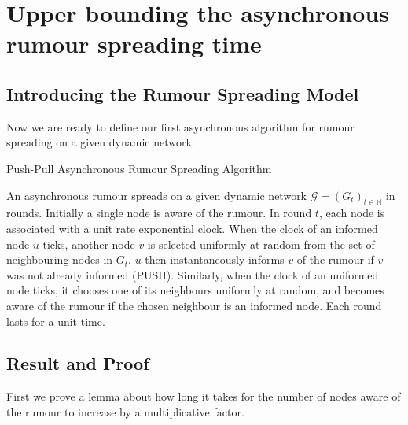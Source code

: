 \section{Upper bounding the asynchronous rumour spreading time}
\label{AsyncUpperBoundSection}

\subsection{Introducing the Rumour Spreading Model}
Now we are ready to define our first asynchronous algorithm for rumour spreading on a given dynamic network.

\begin{definition}
	Push-Pull Asynchronous Rumour Spreading Algorithm 
\end{definition}
\label{NodeCentricAsyncAlgorithm}

\noindent
An asynchronous rumour spreads on a given dynamic network $\mathcal{G} = (G_t)_{t\in \mathbb{N}}$ in rounds. Initially a single node is aware of the rumour. In round $t$, each node is associated with a unit rate exponential clock. When the clock of an informed node $u$ ticks, another node $v$ is selected uniformly at random from the set of neighbouring nodes in $G_t$. $u$ then instantaneously informs $v$ of the rumour if $v$ was not already informed (PUSH). Similarly, when the clock of an uniformed node ticks, it chooses one of its neighbours uniformly at random, and becomes aware of the rumour if the chosen neighbour is an informed node. Each round lasts for a unit time. %




\subsection{Result and Proof}

First we prove a lemma about how long it takes for the number of nodes aware of the rumour to increase by a multiplicative factor. 

